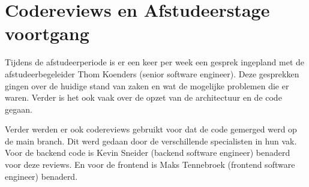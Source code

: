 \section{Codereviews en Afstudeerstage voortgang}
\label{section:CodereviewsEnStageVoortgang}
Tijdens de afstudeerperiode is er een keer per week een gesprek ingepland met de afstudeerbegeleider Thom Koenders (senior software engineer).
Deze gesprekken gingen over de huidige stand van zaken en wat de mogelijke problemen die er waren.
Verder is het ook vaak over de opzet van de architectuur en de code gegaan.

\whitespace
Verder werden er ook codereviews gebruikt voor dat de code gemerged werd op de main branch.
Dit werd gedaan door de verschillende specialisten in hun vak.
Voor de backend code is Kevin Sneider (backend software engineer) benaderd voor deze reviews.
En voor de frontend is Maks Tennebroek (frontend software engineer) benaderd.
